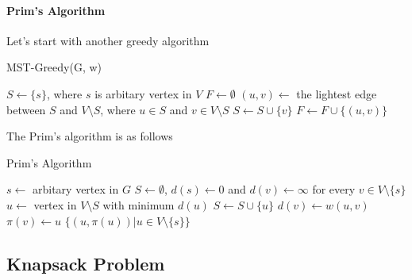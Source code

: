             \paragraph{Prim's Algorithm}
                Let's start with another greedy algorithm
                \begin{algorithm}[H]
                    \caption{MST-Greedy(G, w)}
                    \begin{algorithmic}
                        \State $S \gets \{s\}$, where $s$ is arbitary vertex in $V$
                        \State $F \gets \emptyset$
                            \State $(u, v) \gets$ the lightest edge between $S$ and $V \setminus S$, where $u \in S$ and $v \in V \setminus S$
                            \State $S \gets S \cup \{v\}$
                            \State $F \gets F \cup \{(u, v)\}$
                        \EndWhile
                    \end{algorithmic}
                \end{algorithm}

                The Prim's algorithm is as follows
                \begin{algorithm}[H]
                    \caption{Prim's Algorithm}
                    \begin{algorithmic}
                        \State $s \gets$ arbitary vertex in $G$
                        \State $S \gets \emptyset$, $d(s) \gets 0$ and $d(v) \gets \infty$ for every $v \in V \setminus \{s\}$
                            \State $u \gets $ vertex in $V\setminus S$ with minimum $d(u)$
                            \State $S \gets S \cup \{u\}$
                                    \State $d(v) \gets w(u, v)$
                                    \State $\pi(v) \gets u$
                                \EndIf
                            \EndFor
                        \EndWhile
                        \State \Return $\{(u, \pi(u))| u \in V \setminus \{s\}\}$
                    \end{algorithmic}
                \end{algorithm}

        \subsection{Knapsack Problem}
